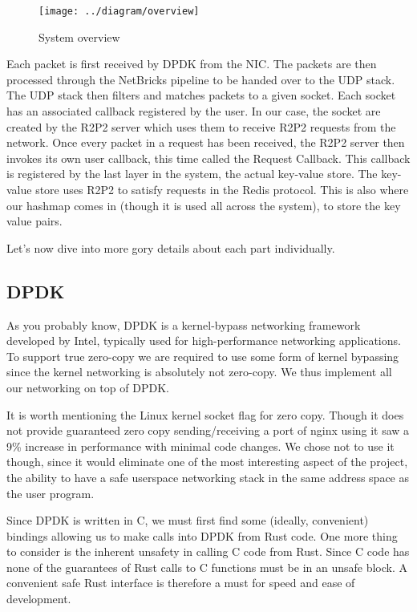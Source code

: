 \documentclass[11pt]{article}
\begin{document}
\begin{figure}
  \texttt{[image: ../diagram/overview]}
  \caption{System overview}
  \label{fig:design-overview}
\end{figure}

Each packet is first received by DPDK from the NIC. The packets are
then processed through the NetBricks pipeline to be handed over to the
UDP stack. The UDP stack then filters and matches packets to a given
socket. Each socket has an associated callback registered by the
user. In our case, the socket are created by the R2P2 server which
uses them to receive R2P2 requests from the network. Once every packet
in a request has been received, the R2P2 server then invokes its own
user callback, this time called the Request Callback. This callback
is registered by the last layer in the system, the actual key-value
store. The key-value store uses R2P2 to satisfy requests in the Redis
protocol. This is also where our hashmap comes in (though it is used
all across the system), to store the key value pairs.

Let's now dive into more gory details about each part individually.


\subsection{DPDK}

As you probably know, DPDK is a kernel-bypass networking framework
developed by Intel, typically used for high-performance networking
applications. To support true zero-copy we are required to use some
form of kernel bypassing since the kernel networking is absolutely
not zero-copy. We thus implement all our networking on top of DPDK.

It is worth mentioning the Linux kernel socket flag for zero copy.
Though it does not provide guaranteed zero copy sending/receiving a
port of nginx using it saw a 9\% increase in performance with minimal
code changes. We chose not to use it though, since it would eliminate
one of the most interesting aspect of the project, the ability to have
a safe userspace networking stack in the same address space as the
user program.

Since DPDK is written in C, we must first find some (ideally,
convenient) bindings allowing us to make calls into DPDK from Rust
code. One more thing to consider is the inherent unsafety in calling C
code from Rust. Since C code has none of the guarantees of Rust calls
to C functions must be in an unsafe block. A convenient safe Rust
interface is therefore a must for speed and ease of development.
\end{document}

